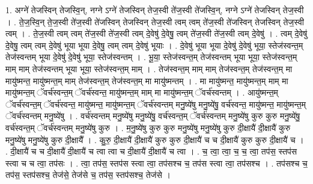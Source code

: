 \documentclass[17pt]{extarticle}
\begin{document}
1. अग्ने॑ तेजस्विन् तेजस्वि॒न्, नग्ने ऽग्ने॑ तेजस्विन् तेज॒स्वी ते॑ज॒स्वी ते॑जस्वि॒न्, नग्ने ऽग्ने॑ तेजस्विन् तेज॒स्वी । . ते॒ज॒स्वि॒न् ते॒ज॒स्वी ते॑ज॒स्वी ते॑जस्विन् तेजस्विन् तेज॒स्वी त्वम् त्वम् ते॑ज॒स्वी ते॑जस्विन् तेजस्विन् तेज॒स्वी त्वम् । . ते॒ज॒स्वी त्वम् त्वम् ते॑ज॒स्वी ते॑ज॒स्वी त्वम् दे॒वेषु॑ दे॒वेषु॒ त्वम् ते॑ज॒स्वी ते॑ज॒स्वी त्वम् दे॒वेषु॑ । . त्वम् दे॒वेषु॑ दे॒वेषु॒ त्वम् त्वम् दे॒वेषु॑ भूया भूया दे॒वेषु॒ त्वम् त्वम् दे॒वेषु॑ भूयाः । . दे॒वेषु॑ भूया भूया दे॒वेषु॑ दे॒वेषु॑ भूया॒ स्तेज॑स्वन्त॒म् तेज॑स्वन्तम् भूया दे॒वेषु॑ दे॒वेषु॑ भूया॒ स्तेज॑स्वन्तम् । . भू॒या॒ स्तेज॑स्वन्त॒म् तेज॑स्वन्तम् भूया भूया॒ स्तेज॑स्वन्त॒म् माम् माम् तेज॑स्वन्तम् भूया भूया॒ स्तेज॑स्वन्त॒म् माम् । . तेज॑स्वन्त॒म् माम् माम् तेज॑स्वन्त॒म् तेज॑स्वन्त॒म् मा मायु॑ष्मन्त॒ मायु॑ष्मन्त॒म् माम् तेज॑स्वन्त॒म् तेज॑स्वन्त॒म् मा मायु॑ष्मन्तम् । . मा मायु॑ष्मन्त॒ मायु॑ष्मन्त॒म् माम् मा मायु॑ष्मन्त॒म् ॅवर्च॑स्वन्त॒म् ॅवर्च॑स्वन्त॒ मायु॑ष्मन्त॒म् माम् मा मायु॑ष्मन्त॒म् ॅवर्च॑स्वन्तम् । . आयु॑ष्मन्त॒म् ॅवर्च॑स्वन्त॒म् ॅवर्च॑स्वन्त॒ मायु॑ष्मन्त॒ मायु॑ष्मन्त॒म् ॅवर्च॑स्वन्तम् मनु॒ष्ये॑षु मनु॒ष्ये॑षु॒ वर्च॑स्वन्त॒ मायु॑ष्मन्त॒ मायु॑ष्मन्त॒म् ॅवर्च॑स्वन्तम् मनु॒ष्ये॑षु । . वर्च॑स्वन्तम् मनु॒ष्ये॑षु मनु॒ष्ये॑षु॒ वर्च॑स्वन्त॒म् ॅवर्च॑स्वन्तम् मनु॒ष्ये॑षु कुरु कुरु मनु॒ष्ये॑षु॒ वर्च॑स्वन्त॒म् ॅवर्च॑स्वन्तम् मनु॒ष्ये॑षु कुरु । . म॒नु॒ष्ये॑षु कुरु कुरु मनु॒ष्ये॑षु मनु॒ष्ये॑षु कुरु दी॒क्षायै॑ दी॒क्षायै॑ कुरु मनु॒ष्ये॑षु मनु॒ष्ये॑षु कुरु दी॒क्षायै᳚ । . कु॒रु॒ दी॒क्षायै॑ दी॒क्षायै॑ कुरु कुरु दी॒क्षायै॑ च च दी॒क्षायै॑ कुरु कुरु दी॒क्षायै॑ च । . दी॒क्षायै॑ च च दी॒क्षायै॑ दी॒क्षायै॑ च त्वा त्वा च दी॒क्षायै॑ दी॒क्षायै॑ च त्वा । . च॒ त्वा॒ त्वा॒ च॒ च॒ त्वा॒ तप॑स॒ स्तप॑स स्त्वा च च त्वा॒ तप॑सः । . त्वा॒ तप॑स॒ स्तप॑स स्त्वा त्वा॒ तप॑सश्च च॒ तप॑स स्त्वा त्वा॒ तप॑सश्च । . तप॑सश्च च॒ तप॑स॒ स्तप॑सश्च॒ तेज॑से॒ तेज॑से च॒ तप॑स॒ स्तप॑सश्च॒ तेज॑से । \newline
\end{document}
